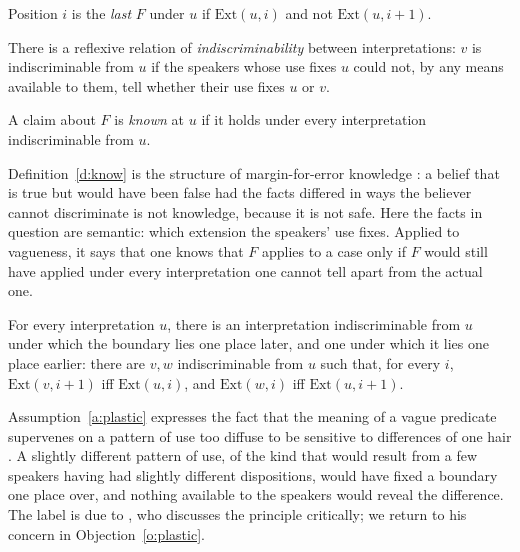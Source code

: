 \documentclass{situationist-preprint}
\begin{document}
\begin{definition}[Boundary]\label{d:last}
Position $i$ is the \emph{last} $F$ under $u$ if $\mathrm{Ext}(u,i)$ and not $\mathrm{Ext}(u,i+1)$.
\end{definition}

\begin{assumption}[Indiscriminability]\label{a:close}
There is a reflexive relation of \emph{indiscriminability} between interpretations: $v$ is indiscriminable from $u$ if the speakers whose use fixes $u$ could not, by any means available to them, tell whether their use fixes $u$ or $v$.
\end{assumption}

\begin{definition}[Knowledge]\label{d:know}
A claim about $F$ is \emph{known} at $u$ if it holds under every interpretation indiscriminable from $u$.
\end{definition}

Definition~\ref{d:know} is the structure of margin-for-error knowledge \citep{Williamson1994,Williamson2000}: a belief that is true but would have been false had the facts differed in ways the believer cannot discriminate is not knowledge, because it is not safe. Here the facts in question are semantic: which extension the speakers' use fixes. Applied to vagueness, it says that one knows that $F$ applies to a case only if $F$ would still have applied under every interpretation one cannot tell apart from the actual one.

\begin{assumption}\label{a:plastic}
For every interpretation $u$, there is an interpretation indiscriminable from $u$ under which the boundary lies one place later, and one under which it lies one place earlier: there are $v, w$ indiscriminable from $u$ such that, for every $i$, $\mathrm{Ext}(v,i+1)$ iff $\mathrm{Ext}(u,i)$, and $\mathrm{Ext}(w,i)$ iff $\mathrm{Ext}(u,i+1)$.
\end{assumption}

Assumption~\ref{a:plastic} expresses the fact that the meaning of a vague predicate supervenes on a pattern of use too diffuse to be sensitive to differences of one hair \citep[ch.~7]{Williamson1994}. A slightly different pattern of use, of the kind that would result from a few speakers having had slightly different dispositions, would have fixed a boundary one place over, and nothing available to the speakers would reveal the difference. The label is due to \citet{Hawthorne2006}, who discusses the principle critically; we return to his concern in Objection~\ref{o:plastic}.
\end{document}
